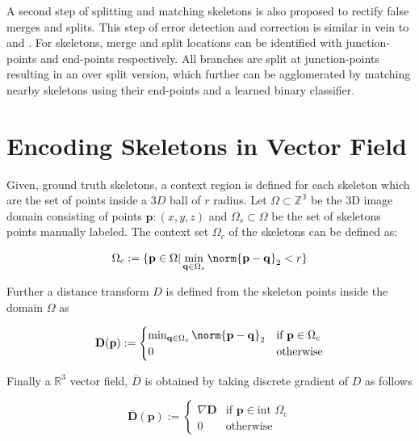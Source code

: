 A second step of splitting and matching skeletons is also proposed to rectify false merges and splits. This step of error detection and correction is similar in vein to \cite{Brain2019} and \cite{Seung2017}.
For skeletons, merge and split locations can be identified with junction-points and end-points respectively. All branches are split at junction-points resulting in an over split version, which further can be agglomerated by matching nearby skeletons using their end-points and a learned binary classifier.

\section{Encoding Skeletons in Vector Field}
Given, ground truth skeletons, a context region is defined for each skeleton which are the set of points inside a $3D$ ball of $r$ radius.
Let $\Omega \subset \mathbb{Z^3}$  be the 3D image domain consisting of points $\mathbf{p}: (x, y, z)$ and ${\Omega}_s \subset \Omega$ be the set of skeletons points manually labeled. The context set ${\Omega}_c$ of the skeletons can be defined as:

\DeclarePairedDelimiter\norm\lVert\rVert

\begin{equation}
{\Omega}_c := \{ \mathbf{p} \in \Omega \vert \min_{\mathbf{q} \in \Omega_s} \norm{\mathbf{p} - \mathbf{q}}_2 < r \} 
\end{equation}

Further a distance transform $D$ is defined from the skeleton points inside the domain $\Omega$ as

\begin{equation}
\mathbf{D}(\mathbf{p}) := \begin{cases}
		\min_{\mathbf{q} \in \Omega_s} \norm{\mathbf{p}-\mathbf{q}}_2 & \text{if } \mathbf{p} \in \Omega_c \\
		0  & \text{otherwise}
		\end{cases} 
\end{equation}

Finally a $\mathbb{R}^3$ vector field, $\overline{D}$ is obtained by taking discrete gradient of $D$ as follows

\begin{equation}
 \overline{\mathbf{D}}(\mathbf{p}) := \begin{cases}
 \nabla \mathbf{D} & \text{if } \mathbf{p} \in \text{int } \Omega_c \\
 0  & \text{otherwise}
 \end{cases} 
\end{equation}
 
